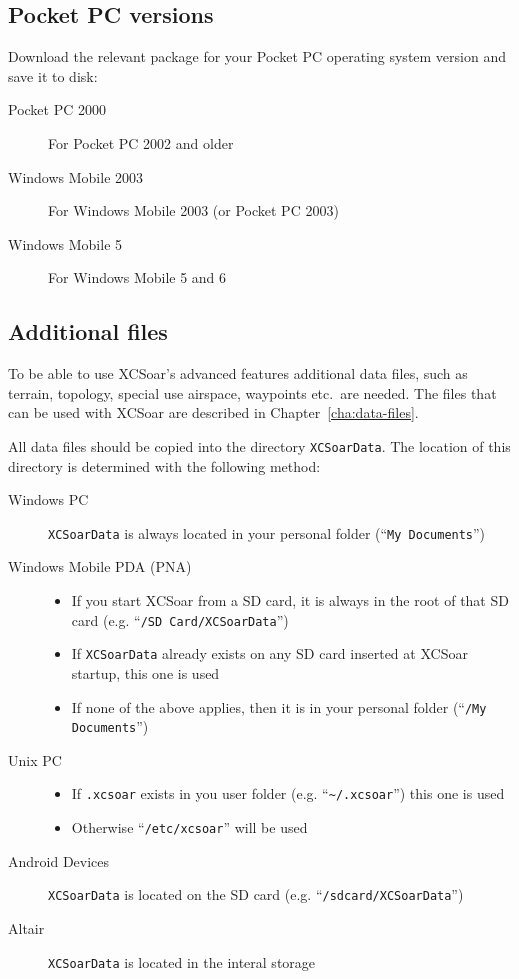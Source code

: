 \documentclass[a4paper,12pt]{refrep}
\begin{document}
\subsection*{Pocket PC versions}
Download the relevant package for your Pocket PC operating system
version and save it to disk:
\begin{description}
\item[Pocket PC 2000] For Pocket PC 2002 and older
\item[Windows Mobile 2003] For Windows Mobile 2003 (or Pocket PC 2003)
\item[Windows Mobile 5] For Windows Mobile 5 and 6
\end{description}

\subsection*{Additional files}
To be able to use XCSoar's advanced features additional data files, such as
terrain, topology, special use airspace, waypoints etc.\ are needed. The files
that can be used with XCSoar are described in Chapter~\ref{cha:data-files}.

All data files should be copied into the directory \texttt{XCSoarData}. The
location of this directory is determined with the following method:

\begin{description}
\item[Windows PC]
\texttt{XCSoarData} is always located in your personal folder (``\texttt{My
Documents}'')
\item[Windows Mobile PDA (PNA)]
\begin{itemize}
\item If you start XCSoar from a SD card, it is always in the root of
  that SD card (e.g. ``\texttt{/SD Card/XCSoarData}'')
\item If \texttt{XCSoarData} already exists on any SD card inserted
  at XCSoar startup, this one is used
\item If none of the above applies, then it is in your personal folder
  (``\texttt{/My Documents}'')
\end{itemize}
\item[Unix PC]
\begin{itemize}
\item If \texttt{.xcsoar} exists in you user folder (e.g.
``\texttt{\~{}/.xcsoar}'') this one is used
\item Otherwise ``\texttt{/etc/xcsoar}'' will be used
\end{itemize}
\item[Android Devices]
\texttt{XCSoarData} is located on the SD card (e.g.
``\texttt{/sdcard/XCSoarData}'')
\item[Altair]
\texttt{XCSoarData} is located in the interal storage
\end{description}
\end{document}
